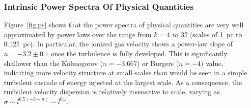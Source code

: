 \documentclass[useAMS,usenatbib]{mn2e}
\newcounter{ionstage}
\newcommand{\ion}[2]{\setcounter{ionstage}{#2}%
  \ensuremath{\mathrm{#1\,\scriptstyle\Roman{ionstage}}}}
\newcommand\hii{\ion{H}{2}}
\begin{document}

\subsubsection{Intrinsic Power Spectra Of Physical Quantities}
\label{sssec:ips}
Figure~\ref{fig:ps} shows that
the power spectra of physical quantities are very well approximated
by power laws over the range from $k = 4$ to 32
(scales of 1~pc to 0.125~pc).
In particular, the ionized gas velocity shows
a power-law slope of \(n = -3.2 \pm 0.1\)
once the turbulence is fully developed. 
This is significantly shallower than the Kolmogorov (\(n = -3.667\))
or Burgers (\(n = -4\)) value,
indicating more velocity structure at small scales than would be seen
in a simple turbulent cascade of energy injected at the largest scale.
As a consequence,
the turbulent velocity dispersion is relatively insensitive to scale,
varying as \(\sigma \sim l^{0.5 (-3 - n)} \sim l^{0.1}\). 

\end{document}
